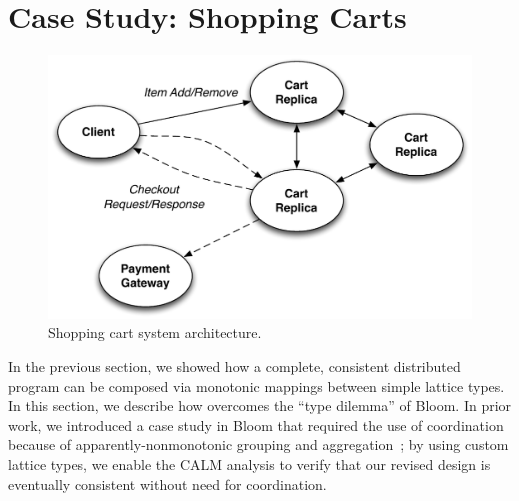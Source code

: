 \section{Case Study: Shopping Carts}
\label{sec:carts}

\begin{figure}[t]
\centering
\includegraphics[width=\linewidth]{fig/cart_arch.pdf}
\caption{Shopping cart system architecture.}
\label{fig:cart-system-arch}
\end{figure}

In the previous section, we showed how a complete, consistent distributed
program can be composed via monotonic mappings between simple lattice types. In
this section, we describe how \lang overcomes the ``type dilemma'' of Bloom. In
prior work, we introduced a case study in Bloom that required the use of
coordination because of apparently-nonmonotonic grouping and
aggregation~\cite{Alvaro2011}; by using custom lattice types, we enable the
\lang CALM analysis to verify that our revised design is eventually consistent
without need for coordination.


% 

